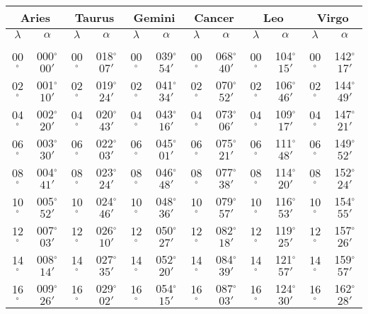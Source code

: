 \begin{table}
\centering
{\small \begin{tabular}{cc|cc|cc|cc|cc|cc}
\multicolumn{2}{c}{Aries}\vline & \multicolumn{2}{c}{Taurus} \vline& \multicolumn{2}{c}{Gemini} \vline& \multicolumn{2}{c}{Cancer}\vline &
\multicolumn{2}{c}{Leo}\vline & \multicolumn{2}{c}{Virgo}\\\hline
$\lambda$& $\alpha$& $\lambda$& $\alpha$& $\lambda$& $\alpha$& $\lambda$& $\alpha$& $\lambda$& $\alpha$& $\lambda$& $\alpha$\\\hline
&&&&&&&&&&&\\[-2ex]
00$^\circ$ & 000$^\circ$$00'$ & 00$^\circ$ & 018$^\circ$$07'$ & 00$^\circ$ & 039$^\circ$$54'$ & 00$^\circ$ & 068$^\circ$$40'$ & 00$^\circ$ & 104$^\circ$$15'$ & 00$^\circ$ & 142$^\circ$$17'$\\
02$^\circ$ & 001$^\circ$$10'$ & 02$^\circ$ & 019$^\circ$$24'$ & 02$^\circ$ & 041$^\circ$$34'$ & 02$^\circ$ & 070$^\circ$$52'$ & 02$^\circ$ & 106$^\circ$$46'$ & 02$^\circ$ & 144$^\circ$$49'$\\
04$^\circ$ & 002$^\circ$$20'$ & 04$^\circ$ & 020$^\circ$$43'$ & 04$^\circ$ & 043$^\circ$$16'$ & 04$^\circ$ & 073$^\circ$$06'$ & 04$^\circ$ & 109$^\circ$$17'$ & 04$^\circ$ & 147$^\circ$$21'$\\
06$^\circ$ & 003$^\circ$$30'$ & 06$^\circ$ & 022$^\circ$$03'$ & 06$^\circ$ & 045$^\circ$$01'$ & 06$^\circ$ & 075$^\circ$$21'$ & 06$^\circ$ & 111$^\circ$$48'$ & 06$^\circ$ & 149$^\circ$$52'$\\
08$^\circ$ & 004$^\circ$$41'$ & 08$^\circ$ & 023$^\circ$$24'$ & 08$^\circ$ & 046$^\circ$$48'$ & 08$^\circ$ & 077$^\circ$$38'$ & 08$^\circ$ & 114$^\circ$$20'$ & 08$^\circ$ & 152$^\circ$$24'$\\
10$^\circ$ & 005$^\circ$$52'$ & 10$^\circ$ & 024$^\circ$$46'$ & 10$^\circ$ & 048$^\circ$$36'$ & 10$^\circ$ & 079$^\circ$$57'$ & 10$^\circ$ & 116$^\circ$$53'$ & 10$^\circ$ & 154$^\circ$$55'$\\
12$^\circ$ & 007$^\circ$$03'$ & 12$^\circ$ & 026$^\circ$$10'$ & 12$^\circ$ & 050$^\circ$$27'$ & 12$^\circ$ & 082$^\circ$$18'$ & 12$^\circ$ & 119$^\circ$$25'$ & 12$^\circ$ & 157$^\circ$$26'$\\
14$^\circ$ & 008$^\circ$$14'$ & 14$^\circ$ & 027$^\circ$$35'$ & 14$^\circ$ & 052$^\circ$$20'$ & 14$^\circ$ & 084$^\circ$$39'$ & 14$^\circ$ & 121$^\circ$$57'$ & 14$^\circ$ & 159$^\circ$$57'$\\
16$^\circ$ & 009$^\circ$$26'$ & 16$^\circ$ & 029$^\circ$$02'$ & 16$^\circ$ & 054$^\circ$$15'$ & 16$^\circ$ & 087$^\circ$$03'$ & 16$^\circ$ & 124$^\circ$$30'$ & 16$^\circ$ & 162$^\circ$$28'$\\

\end{tabular}}
\end{table}
